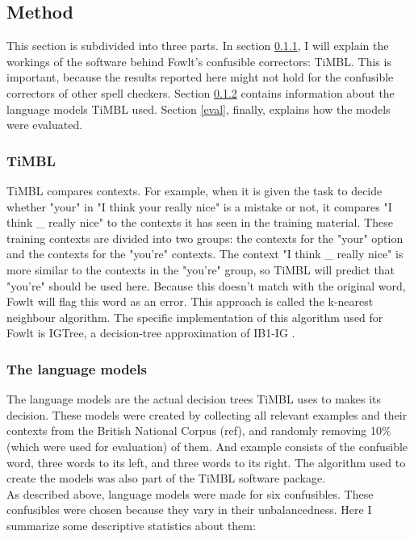 \documentclass[12pt]{article}
\begin{document}

\subsection{Method}
This section is subdivided into three parts. In section \ref{timbl}, I will explain the workings of the software behind Fowlt's confusible correctors: TiMBL. This is important, because the results reported here might not hold for the confusible correctors of other spell checkers. Section \ref{langmod} contains information about the language models  TiMBL used. Section \ref{eval}, finally, explains how the models were evaluated.


\subsubsection{TiMBL} \label{timbl}
TiMBL compares contexts. For example, when it is given the task to decide whether "your" in "I think your really nice" is a mistake or not, it compares "I think \_ really nice" to the contexts it has seen in the training material. These training contexts are divided into two groups: the contexts for the "your" option and the contexts for the "you're" contexts. The context "I think \_ really nice" is more similar to the contexts in the "you're" group, so TiMBL will predict that "you're" should be used here. Because this doesn't match with the original word, Fowlt will flag this word as an error. This approach is called the k-nearest neighbour algorithm. The specific implementation of this algorithm used for Fowlt is IGTree, a decision-tree approximation of IB1-IG \citep{dvdbw97}.

\subsubsection{The language models} \label{langmod}

The language models are the actual decision trees TiMBL uses to makes its decision. These models were created by collecting all relevant examples and their contexts from the British National Corpus (ref), and randomly removing 10\% (which were used for evaluation) of them. And example consists of the confusible word, three words to its left, and three words to its right. The algorithm used to create the models was also part of the TiMBL software package.\\\indent
As described above, language models were made for six confusibles. These confusibles were chosen because they vary in their unbalancedness. Here I summarize some descriptive statistics about them:
\end{document}
